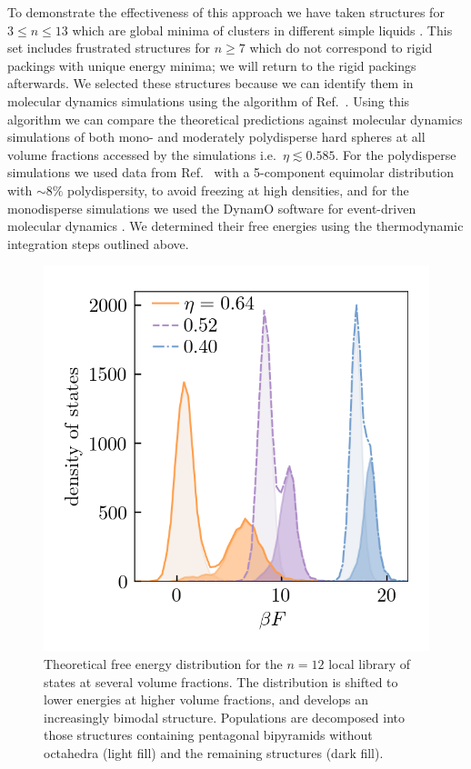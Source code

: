 \documentclass[11pt,twoside]{report}
\begin{document}
To demonstrate the effectiveness of this approach we have taken structures for $3 \le n \le 13$ which are global minima of clusters in different simple liquids \cite{Wales2004}.
This set includes frustrated structures for $n \ge 7$ which do not correspond to rigid packings with unique energy minima; we will return to the rigid packings afterwards.
We selected these structures because we can identify them in molecular dynamics simulations using the algorithm of Ref.\ \cite{MalinsTCC2013}.
Using this algorithm we can compare the theoretical predictions against molecular dynamics simulations of both mono- and moderately polydisperse hard spheres at all volume fractions accessed by the simulations i.e.\ $\eta \lesssim 0.585$.
For the polydisperse simulations we used data from Ref.\ \cite{RoyallJSM2017} with a 5-component equimolar distribution with $\sim8\%$ polydispersity, to avoid freezing at high densities, and for the monodisperse simulations we used the DynamO software for event-driven molecular dynamics \cite{BannermanJCC2011}.
We determined their free energies using the thermodynamic integration steps outlined above.

\begin{figure}
  \includegraphics[width=0.9\linewidth,outer]{n12-dos}
  \caption[Free energy distribution of 12 particle structures]{
    Theoretical free energy distribution for the $n=12$ local library of states at several volume fractions.
    The distribution is shifted to lower energies at higher volume fractions, and develops an increasingly bimodal structure.
    Populations are decomposed into those structures containing pentagonal bipyramids without octahedra (light fill) and the remaining structures (dark fill).
  }
  \label{fig:n12-dos}
\end{figure}
\end{document}

